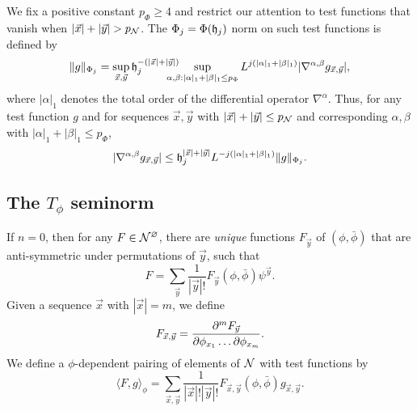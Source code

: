 We fix a positive constant $p_\Phi\ge 4$ and restrict our attention to test functions
that vanish when $|\vec x|  +|\vec y| > p_{\mathcal{N}}$.
The $\Phi_j = \Phi(\mathfrak{h}_j)$ norm on such test functions is defined by
\begin{equation}
\|g\|_{\Phi_j}
	=
\sup_{\vec x, \vec y} \h_j^{-(|\vec x| +|\vec y|)}
	\shift\shift
\sup_{\alpha,\beta: |\alpha|_1+|\beta|_1 \le p_\Phi}
L^{j (|\alpha|_1 + |\beta|_1)}
|\nabla^{\alpha,\beta} g_{\vec x, \vec y}|,
\end{equation}
where $|\alpha|_1$ denotes the total order of the differential operator $\nabla^\alpha$.
Thus, for any test function $g$ and for sequences
$\vec x, \vec y$ with $|\vec x| +|\vec y| \leq p_{\mathcal{N}}$ and
corresponding $\alpha, \beta$ with $|\alpha|_1 + |\beta|_1 \leq p_\Phi$,
\begin{equation}
\label{e:testfcnbd}
|\nabla^{\alpha,\beta} g_{\vec x,\vec y}|
	\leq
\mathfrak{h}_j^{|\vec x| + |\vec y|} L^{-j (|\alpha|_1 + |\beta|_1)} \|g\|_{\Phi_j}.
\end{equation}


\subsection{The \texorpdfstring{$T_\phi$}{Tphi} seminorm}
\label{sec:Tphi}

If $n = 0$, then for any $F \in \mathcal{N}^\varnothing$, there are
\emph{unique} functions $F_{\vec y}$ of $(\phi, \bar\phi)$
that are anti-symmetric under permutations of $\vec y$, such that
\begin{equation}
F = \sum_{\vec y} \frac{1}{|\vec y|!} F_{\vec y}(\phi, \bar\phi) \psi^{\vec y}.
\end{equation}
Given a sequence $\vec{x}$ with $|\vec{x}| = m$, we define
\begin{equation}
F_{\vec x, \vec y} = \frac{\partial ^m F_{\vec y}}{\partial \phi_{x_1} \ldots \partial\phi_{x_m}}.
\end{equation}
We define a $\phi$-dependent pairing of elements of $\mathcal{N}$ with test functions by
\begin{equation}
\label{e:pairing}
\langle F, g \rangle_\phi
  =
\sum_{\vec x, \vec y}
\frac{1}{|\vec x|! |\vec y|!}
F_{\vec x,\vec y}(\phi, \bar\phi)
g_{\vec x,\vec y}.
\end{equation}

